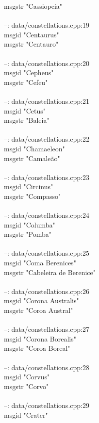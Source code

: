 \documentclass[10pt]{article}
\begin{document}
msgstr "Cassiopeia"\\
\\
--: data/constellations.cpp:19\\
msgid "Centaurus"\\
msgstr "Centauro"\\
\\
--: data/constellations.cpp:20\\
msgid "Cepheus"\\
msgstr "Cefeu"\\
\\
--: data/constellations.cpp:21\\
msgid "Cetus"\\
msgstr "Baleia"\\
\\
--: data/constellations.cpp:22\\
msgid "Chamaeleon"\\
msgstr "Camaleão"\\
\\
--: data/constellations.cpp:23\\
msgid "Circinus"\\
msgstr "Compasso"\\
\\
--: data/constellations.cpp:24\\
msgid "Columba"\\
msgstr "Pomba"\\
\\
--: data/constellations.cpp:25\\
msgid "Coma Berenices"\\
msgstr "Cabeleira de Berenice"\\
\\
--: data/constellations.cpp:26\\
msgid "Corona Australis"\\
msgstr "Coroa Austral"\\
\\
--: data/constellations.cpp:27\\
msgid "Corona Borealis"\\
msgstr "Coroa Boreal"\\
\\
--: data/constellations.cpp:28\\
msgid "Corvus"\\
msgstr "Corvo"\\
\\
--: data/constellations.cpp:29\\
msgid "Crater"\\
\end{document}
